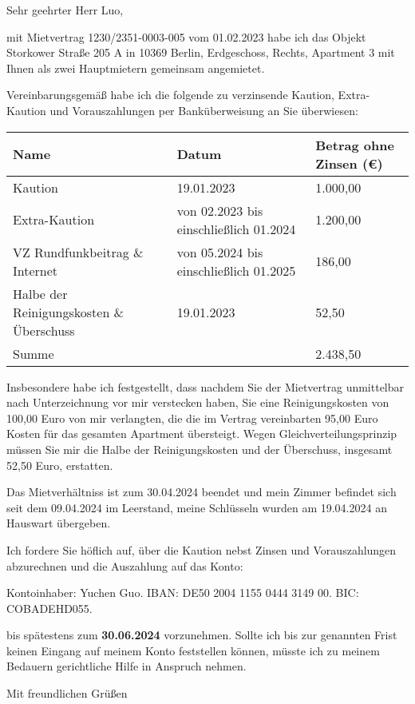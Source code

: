 \documentclass[fontsize=10pt,version=last,ngerman,backaddress=off,parskip]{scrlttr2}
\begin{document}
\begin{letter}{}
  \opening{Sehr geehrter Herr Luo,} mit Mietvertrag 1230/2351-0003-005
  vom 01.02.2023 habe ich das Objekt Storkower Straße 205 A in 10369
  Berlin, Erdgeschoss, Rechts, Apartment 3 mit Ihnen als zwei
  Hauptmietern gemeinsam angemietet.

  Vereinbarungsgemäß habe ich die folgende zu verzinsende Kaution,
  Extra-Kaution und Vorauszahlungen per Banküberweisung an Sie
  überwiesen:
  \begin{center}
\begin{tabular}{ m{6cm} | m{5.5cm}| m{3.3cm} } 
 Name & Datum & Betrag ohne Zinsen (€) \\
\hline
  Kaution & 19.01.2023 & 1.000,00 \\
  Extra-Kaution & von 02.2023 bis einschließlich 01.2024 & 1.200,00 \\
  VZ Rundfunkbeitrag \& Internet & von 05.2024 bis einschließlich 01.2025
              & 186,00 \\
  Halbe der Reinigungskosten \& Überschuss & 19.01.2023 & 52,50 \\
  \hline
  Summe & & 2.438,50
\end{tabular}
  \end{center}
  Insbesondere habe ich festgestellt, dass nachdem Sie der Mietvertrag unmittelbar nach
  Unterzeichnung vor mir verstecken haben, Sie eine Reinigungskosten von
  100,00 Euro von mir verlangten, die die im Vertrag vereinbarten 95,00
  Euro Kosten für das gesamten Apartment übersteigt.  Wegen
  Gleichverteilungsprinzip  müssen Sie mir
  die Halbe der Reinigungskosten und der Überschuss, insgesamt 52,50
  Euro, erstatten.

  Das Mietverhältniss ist zum 30.04.2024 beendet und mein Zimmer
  befindet sich seit dem 09.04.2024 im Leerstand, meine Schlüsseln
  wurden am 19.04.2024 an Hauswart übergeben.

  Ich fordere Sie höflich auf, über die Kaution nebst Zinsen und
  Vorauszahlungen abzurechnen und die Auszahlung auf das Konto:

  Kontoinhaber: Yuchen Guo.  IBAN: DE50 2004 1155 0444 3149 00.  BIC: COBADEHD055.

  bis spätestens zum {\large \textbf{30.06.2024}} vorzunehmen.
  Sollte ich bis zur genannten Frist keinen Eingang auf meinem Konto
  feststellen können, müsste ich zu meinem Bedauern gerichtliche Hilfe
  in Anspruch nehmen.  \closing{Mit freundlichen Grüßen}
\end{letter}
\end{document}
